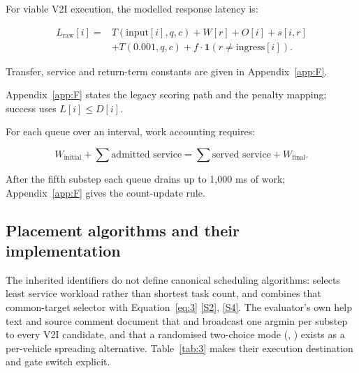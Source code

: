 \documentclass[12pt,a4paper]{article}
\begin{document}
For viable V2I execution, the modelled response latency is:

\begin{equation}\label{eq:4}
 \begin{aligned}
 L_{\mathrm{raw}}[i]={}&T(\mathrm{input}[i],q,c)+W[r]+O[i]+s[i,r]\\
 &+T(0.001,q,c)+f\cdot\mathbf{1}(r\neq\mathrm{ingress}[i]).
 \end{aligned}
\end{equation}

Transfer, service and return-term constants are given in Appendix~\ref{app:F}.

Appendix~\ref{app:F} states the legacy  scoring path and the penalty mapping; success uses $L[i]\leq D[i]$.

For each queue over an interval, work accounting requires:

\begin{equation}\label{eq:5}
 W_{\mathrm{initial}}+\sum\text{admitted service}
 =\sum\text{served service}+W_{\mathrm{final}}.
\end{equation}

After the fifth substep each queue drains up to 1,000 ms of work; Appendix~\ref{app:F} gives the count-update rule.

\FloatBarrier
\subsection{Placement algorithms and their implementation}\label{sec:2.5}

The inherited identifiers do not define canonical scheduling algorithms:  selects least service workload rather than shortest task count, and  combines that common-target selector with Equation~\eqref{eq:3} \hyperref[source-s2]{[S2]}, \hyperref[source-s4]{[S4]}. The evaluator's own help text and source comment document that  and  broadcast one argmin per substep to every V2I candidate, and that a randomised two-choice mode (, ) exists as a per-vehicle spreading alternative. Table~\ref{tab:3} makes their execution destination and gate switch explicit.
\end{document}
